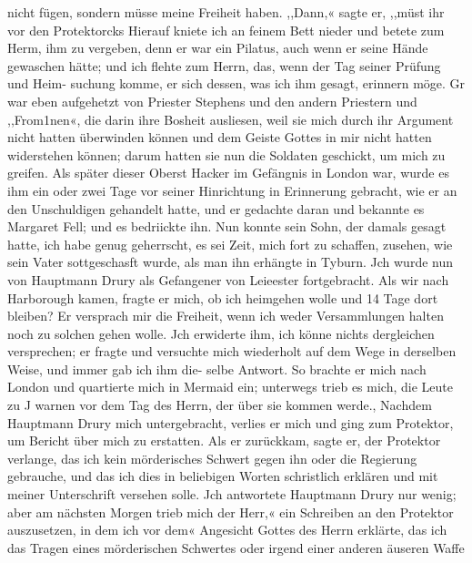 nicht fügen, sondern müsse meine Freiheit haben. ,,Dann,« sagte
er, ,,müst ihr vor den Protektorcks Hierauf kniete ich an feinem
Bett nieder und betete zum Herm, ihm zu vergeben, denn er war
ein Pilatus, auch wenn er seine Hände gewaschen hätte; und ich
flehte zum Herrn, das, wenn der Tag seiner Prüfung und Heim-
suchung komme, er sich dessen, was ich ihm gesagt, erinnern möge.
Gr war eben aufgehetzt von Priester Stephens und den andern
Priestern und ,,From1nen«, die darin ihre Bosheit ausliesen, weil
sie mich durch ihr Argument nicht hatten überwinden können
und dem Geiste Gottes in mir nicht hatten widerstehen können;
darum hatten sie nun die Soldaten geschickt, um mich zu greifen.
Als später dieser Oberst Hacker im Gefängnis in London
war, wurde es ihm ein oder zwei Tage vor seiner Hinrichtung
in Erinnerung gebracht, wie er an den Unschuldigen gehandelt
hatte, und er gedachte daran und bekannte es Margaret Fell;
und es bedriickte ihn. Nun konnte sein Sohn, der damals
gesagt hatte, ich habe genug geherrscht, es sei Zeit, mich fort zu
schaffen, zusehen, wie sein Vater sottgeschasft wurde, als man ihn
erhängte in Tyburn.
Jch wurde nun von Hauptmann Drury als Gefangener von
Leieester fortgebracht. Als wir nach Harborough kamen, fragte
er mich, ob ich heimgehen wolle und 14 Tage dort bleiben? Er
versprach mir die Freiheit, wenn ich weder Versammlungen halten
noch zu solchen gehen wolle. Jch erwiderte ihm, ich könne nichts
dergleichen versprechen; er fragte und versuchte mich wiederholt
auf dem Wege in derselben Weise, und immer gab ich ihm die-
selbe Antwort. So brachte er mich nach London und quartierte
mich in Mermaid ein; unterwegs trieb es mich, die Leute zu J
warnen vor dem Tag des Herrn, der über sie kommen werde.,
Nachdem Hauptmann Drury mich untergebracht, verlies er mich
und ging zum Protektor, um Bericht über mich zu erstatten. Als
er zurückkam, sagte er, der Protektor verlange, das ich kein
mörderisches Schwert gegen ihn oder die Regierung gebrauche,
und das ich dies in beliebigen Worten schristlich erklären und mit
meiner Unterschrift versehen solle. Jch antwortete Hauptmann
Drury nur wenig; aber am nächsten Morgen trieb mich der Herr,«
ein Schreiben an den Protektor auszusetzen, in dem ich vor dem«
Angesicht Gottes des Herrn erklärte, das ich das Tragen eines
mörderischen Schwertes oder irgend einer anderen äuseren Waffe


